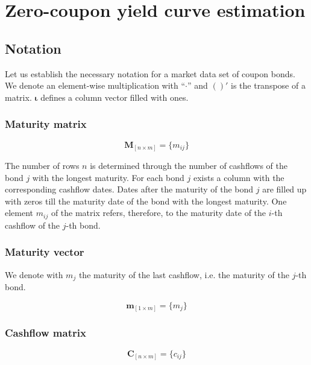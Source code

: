 \section{Zero-coupon yield curve estimation}

\subsection{Notation}
\label{sec:notation}

Let us establish the necessary notation for a market data set of coupon bonds. We denote an element-wise multiplication with ``$\cdot$'' and $( )'$ is the transpose of a matrix. $\bm{\iota}$ defines a column vector filled with ones.

\subsubsection*{Maturity matrix}

\begin{equation}\label{maturitym}
\bm{M}_{\left[n\times m\right]}= \{m_{ij}\}
\end{equation}

The number of rows $n$ is determined through the number of cashflows of the bond $j$ with the longest maturity. For each bond $j$ exists a column with the corresponding cashflow dates. Dates after the maturity of the bond $j$ are filled up with zeros till the maturity date of the bond with the longest maturity. One element $m_{ij}$ of the matrix  refers, therefore, to the maturity date of  the $i$-th cashflow of the $j$-th bond. 

\subsubsection*{Maturity vector}

We denote with $m_j$ the maturity of the last cashflow, i.e. the maturity of the $j$-th bond.

\begin{equation}\label{weights}
    \bm{m}_{\left[1\times m\right]}= \{m_j\}
\end{equation}

\subsubsection*{Cashflow matrix}


 \begin{equation}\label{cashflowm}
\bm{C}_{\left[n\times m\right]}= \{c_{ij}\}
\end{equation}

